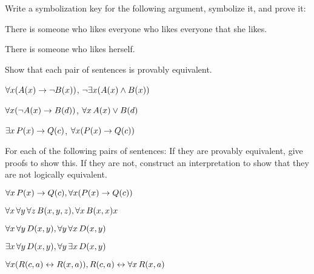 \solutions
\problempart
\label{pr.likes}
Write a symbolization key for the following argument, symbolize it, and prove it:
\begin{earg}
\item There is someone who likes everyone who likes everyone that she
likes. 
\item[\texttherefore] There is someone who likes herself.
\end{earg}


\problempart
Show that each pair of sentences is provably equivalent.
\begin{compactlist}
\item $\forall x (\mathord{A}(x)\rightarrow \neg \mathord{B}(x))$, $\neg\exists x(\mathord{A}(x) \wedge \mathord{B}(x))$
\item $\forall x (\neg\mathord{A}(x)\rightarrow \mathord{B}(d))$, $\forall x\,\mathord{A}(x) \vee \mathord{B}(d)$
\item $\exists x\,\mathord{P}(x) \rightarrow \mathord{Q}(c)$, $\forall x (\mathord{P}(x) \rightarrow \mathord{Q}(c))$
\end{compactlist}

\solutions
\problempart
\label{pr.FOLequivornot}
For each of the following pairs of sentences: If they are provably equivalent, give proofs to show this. If they are not, construct an interpretation to show that they are not logically equivalent.
\begin{compactlist}
\item $\forall x\,\mathord{P}(x) \rightarrow \mathord{Q}(c), \forall x (\mathord{P}(x) \rightarrow \mathord{Q}(c))$
\item $\forall x\,\forall y\, \forall z\,\mathord{B}(x,y,z), \forall x\,\mathord{B}(x,x)x$
\item $\forall x\,\forall y\,\mathord{D}(x,y), \forall y\,\forall x\,\mathord{D}(x,y)$
\item $\exists x\,\forall y\,\mathord{D}(x,y), \forall y\,\exists x\,\mathord{D}(x,y)$
\item $\forall x (\mathord{R}(c,a) \leftrightarrow \mathord{R}(x,a)), \mathord{R}(c,a) \leftrightarrow \forall x\,\mathord{R}(x,a)$
\end{compactlist}


